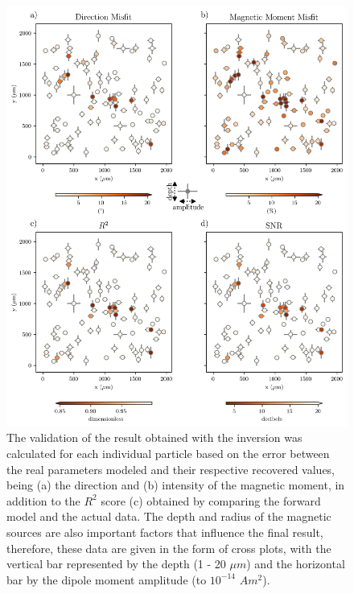 \begin{figure}[tb!]
\centering
\includegraphics[width=0.75\linewidth]{figures/complex-synthetic-comparison.png}
\caption{
The validation of the result obtained with the inversion was calculated for each individual particle based on the error between the real parameters modeled and their respective recovered values, being (a) the direction and (b) intensity of the magnetic moment, in addition to the $R^2$ score (c) obtained by comparing the forward model and the actual data. The depth and radius of the magnetic sources are also important factors that influence the final result, therefore, these data are given in the form of cross plots, with the vertical bar represented by the depth (1 - 20 $\mu m$) and the horizontal bar by the dipole moment amplitude (\DIFdelbeginFL {}\DIFdelendFL \DIFaddbeginFL {}\DIFaddendFL to $10^{-14}$ $Am^2$).
}
\label{complex-synthetic-comparison}
\end{figure}

